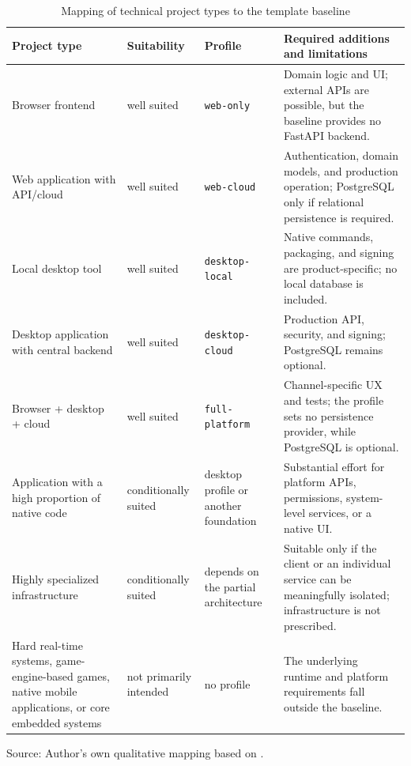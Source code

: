 \begin{table}[H]
  \centering
  \scriptsize
  \renewcommand{\arraystretch}{1.12}
  \caption{Mapping of technical project types to the template baseline}
  \label{tab:project-suitability}
  \begin{tabularx}{\textwidth}{@{}>{\raggedright\arraybackslash}p{}>{\raggedright\arraybackslash}p{}>{\raggedright\arraybackslash}p{}>{\raggedright\arraybackslash}X@{}}
    \toprule
    \textbf{Project type} & \textbf{Suitability} & \textbf{Profile} & \textbf{Required additions and limitations} \\
    \midrule
    Browser frontend & well suited & \texttt{web-only}
      & Domain logic and UI; external APIs are possible, but the baseline provides no FastAPI backend. \\
    Web application with API/cloud & well suited & \texttt{web-cloud}
      & Authentication, domain models, and production operation; PostgreSQL only if relational persistence is required. \\
    Local desktop tool & well suited & \texttt{desktop-local}
      & Native commands, packaging, and signing are product-specific; no local database is included. \\
    Desktop application with central backend & well suited & \texttt{desktop-cloud}
      & Production API, security, and signing; PostgreSQL remains optional. \\
    Browser + desktop + cloud & well suited & \texttt{full-platform}
      & Channel-specific UX and tests; the profile sets no persistence provider, while PostgreSQL is optional. \\
    Application with a high proportion of native code & conditionally suited & desktop profile or another foundation
      & Substantial effort for platform APIs, permissions, system-level services, or a native UI. \\
    Highly specialized infrastructure & conditionally suited & depends on the partial architecture
      & Suitable only if the client or an individual service can be meaningfully isolated; infrastructure is not prescribed. \\
    Hard real-time systems, game-engine-based games, native mobile applications, or core embedded systems
      & not primarily intended & no profile
      & The underlying runtime and platform requirements fall outside the baseline. \\
    \bottomrule
  \end{tabularx}
  \smallskip
  {\footnotesize Source: Author's own qualitative mapping based on
  \textcite{kleiveist2026profiles,kleiveist2026persistence,kleiveist2026acceptance}.\par}
\end{table}
